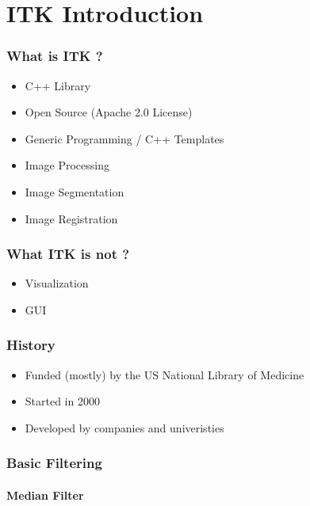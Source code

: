 \section{ITK Introduction}



\begin{frame}
\frametitle{What is ITK ?}
\begin{itemize}
\item C++ Library
\pause
\item Open Source (Apache 2.0 License)
\pause
\item Generic Programming / C++ Templates
\pause
\item Image Processing
\pause
\item Image Segmentation
\pause
\item Image Registration
\end{itemize}
\end{frame}


\begin{frame}
\frametitle{What ITK is not ?}
\begin{itemize}
\item Visualization
\pause
\item GUI
\end{itemize}
\end{frame}


\begin{frame}
\frametitle{History}
\begin{itemize}
\item Funded (mostly) by the US National Library of Medicine
\pause
\item Started in 2000
\pause
\item Developed by companies and univeristies
\end{itemize}
\end{frame}


\begin{frame}
\frametitle{Basic Filtering}
\framesubtitle{Median Filter}
\begin{center}

\end{center}


\end{frame}


